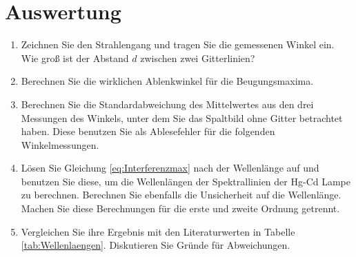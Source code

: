 \section{Auswertung} 

\begin{enumerate}
	\item Zeichnen Sie den Strahlengang und tragen Sie die gemessenen Winkel ein. Wie groß ist der Abstand $d$ zwischen zwei Gitterlinien?
	\item Berechnen Sie die wirklichen Ablenkwinkel für die Beugungsmaxima.
	\item Berechnen Sie die Standardabweichung des Mittelwertes aus den drei Messungen des Winkels, unter dem Sie das Spaltbild ohne Gitter betrachtet haben. Diese benutzen Sie als Ablesefehler für die folgenden Winkelmessungen.
	\item Lösen Sie Gleichung \ref{eq:Interferenzmax} nach der Wellenlänge auf und benutzen Sie diese, um die Wellenlängen der Spektrallinien der Hg-Cd Lampe zu berechnen. Berechnen Sie ebenfalls die Unsicherheit auf die Wellenlänge. Machen Sie diese Berechnungen für die erste und zweite Ordnung getrennt.
	\item Vergleichen Sie ihre Ergebnis mit den Literaturwerten in Tabelle \ref{tab:Wellenlaengen}. Diskutieren Sie Gründe für Abweichungen.
\end{enumerate}

